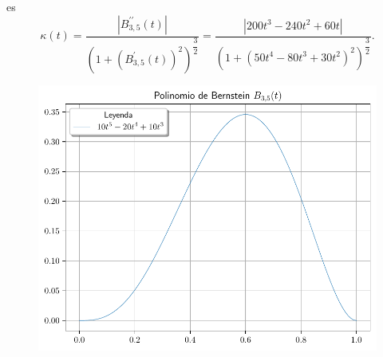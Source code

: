 \begin{frame}
\begin{solution}
        es
        \begin{equation*}
            \boxed{
            \kappa\left(t\right)=
            \dfrac{
                \left|
                B^{\prime\prime}_{3,5}\left(t\right)
                \right|
            }{
                {\left(
                        1+
                        {\left(B^{\prime}_{3,5}\left(t\right)\right)}^{2}
                        \right)}^{\dfrac{3}{2}}
            }=
            \dfrac{
            \left|
            200t^{3}-240t^{2}+60t
            \right|
            }{
            {\left(
                    1+
                    {\left(50t^{4}-80t^{3}+30t^{2}\right)}^{2}
                    \right)}^{\dfrac{3}{2}}
            }.
            }
        \end{equation*}
    \end{solution}
\end{frame}

\begin{frame}
    \begin{solution}
        \begin{figure}[ht!]
            \centering
            \includegraphics[width=.72\paperwidth]{p1}
        \end{figure}
    \end{solution}
\end{frame}

